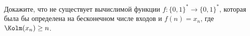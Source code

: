 Докажите, что не существует вычислимой функции $f\colon \{0, 1\}^* \to \{0, 1\}^*$, которая была бы определена
на бесконечном числе входов и $f(n) = x_n$, где $\Kolm(x_n) \ge n$.
